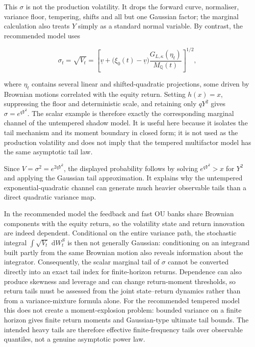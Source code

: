\documentclass[11pt,a4paper]{article}
\newcommand{\Qq}{\mathbb{Q}}
\newcommand{\dd}{\,\mathrm{d}}
\begin{document}
This \(\sigma\) is not the production volatility.  It drops the forward curve, normaliser,
variance floor, tempering, shifts and all but one Gaussian factor; the marginal calculation
also treats \(Y\) simply as a standard normal variable.  By contrast, the recommended model
uses

\begin{equation*}
\sigma_t=\sqrt{V_t}
=\left[\underline v+
\bigl(\xi_0(t)-\underline v\bigr)
\frac{G_{L,\kappa}(\eta_t)}{M_{\Qq}(t)}\right]^{1/2},
\end{equation*}

where \(\eta_t\) contains several linear and shifted-quadratic projections, some driven by
Brownian motions correlated with the equity return.  Setting \(h(x)=x\), suppressing the floor
and deterministic scale, and retaining only \(qY^2\) gives \(\sigma=e^{qY^2}\).  The scalar
example is therefore exactly the corresponding marginal channel of the untempered shadow
model.  It is useful here because it isolates the tail mechanism and its moment boundary in
closed form; it is not used as the production volatility and does not imply that the tempered
multifactor model has the same asymptotic tail law.

Since \(V=\sigma^2=e^{2qY^2}\), the displayed probability follows by solving
\(e^{qY^2}>x\) for \(Y^2\) and applying the Gaussian tail approximation.  It explains why the
untempered exponential-quadratic channel can generate much heavier observable tails than a
direct quadratic variance map.

In the recommended model the feedback and fast OU banks share Brownian components with the
equity return, so the volatility state and return innovation are indeed dependent. Conditional
on the entire variance path, the stochastic integral
\(\int\sqrt{V_t}\,\dd W_t^S\) is then not generally Gaussian: conditioning on an integrand
built partly from the same Brownian motion also reveals information about the integrator.
Consequently, the scalar marginal tail of \(\sigma\) cannot be converted directly into an exact
tail index for finite-horizon returns. Dependence can also produce skewness and leverage and can
change return-moment thresholds, so return tails must be assessed from the joint state--return
dynamics rather than from a variance-mixture formula alone. For the recommended tempered model
this does not create a moment-explosion problem: bounded variance on a finite horizon gives
finite return moments and Gaussian-type ultimate tail bounds. The intended heavy tails are
therefore effective finite-frequency tails over observable quantiles, not a genuine asymptotic
power law.
\end{document}
